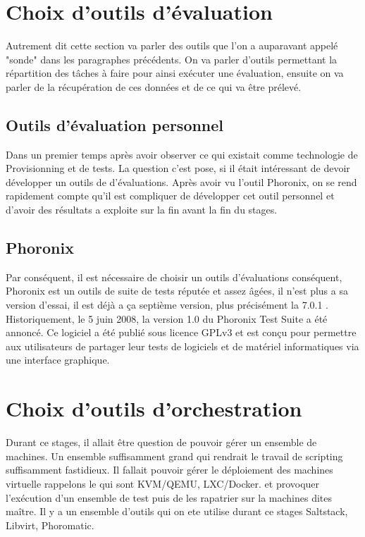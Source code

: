 \section{Choix d'outils d'évaluation}

Autrement dit cette section va parler des outils que l'on a auparavant appelé "sonde" dans les paragraphes précédents. On va parler d'outils permettant la répartition des tâches à faire pour ainsi exécuter une évaluation, ensuite on va parler de la récupération de ces données et de ce qui va être prélevé.

\subsection{Outils d'évaluation personnel}

Dans un premier temps après avoir observer ce qui existait comme technologie de Provisionning et de tests. La question c'est pose, si il était intéressant de devoir développer un outils de d’évaluations. Après avoir vu l’outil Phoronix, on se rend rapidement compte qu'il est compliquer de développer cet outil personnel et d'avoir des résultats a exploite sur la fin avant la fin du stages.

\subsection{Phoronix}

Par conséquent, il est nécessaire de choisir un outils d’évaluations conséquent, Phoronix est un outils de suite de tests réputée et assez âgées, il n'est plus a sa version d'essai, il est déjà a ça septième version, plus précisément la 7.0.1 . Historiquement, le 5 juin 2008, la version 1.0 du Phoronix Test Suite a été annoncé. Ce logiciel a été publié sous licence GPLv3 et est conçu pour permettre aux utilisateurs de partager leur tests de logiciels et de matériel informatiques via une interface graphique.
\newpage
\section{Choix d'outils d'orchestration}
Durant ce stages, il allait être question de pouvoir gérer un ensemble de machines. Un ensemble suffisamment grand qui rendrait le travail de scripting suffisamment fastidieux. Il fallait pouvoir gérer le déploiement des machines virtuelle rappelons le qui sont KVM/QEMU, LXC/Docker. et provoquer l’exécution d'un ensemble de test puis de les rapatrier sur la machines dites maître. Il y a un ensemble d'outils qui on ete utilise durant ce stages Saltstack, Libvirt, Phoromatic.
